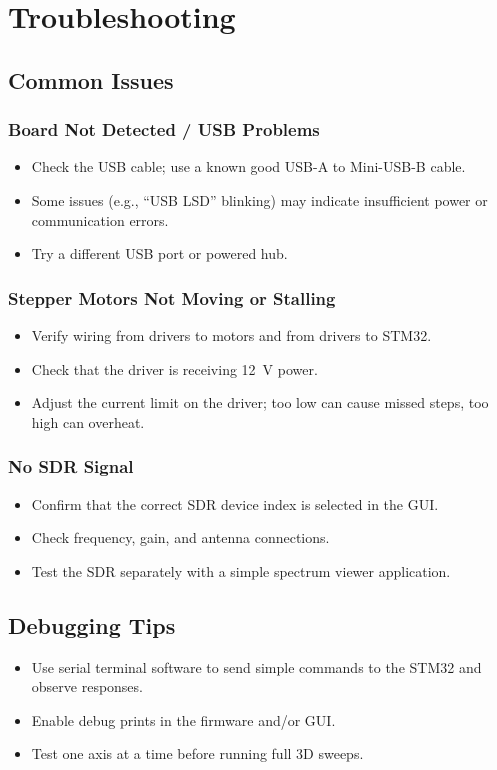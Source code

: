 \chapter{Troubleshooting}

\section{Common Issues}

\subsection{Board Not Detected / USB Problems}

\begin{itemize}
  \item Check the USB cable; use a known good USB-A to Mini-USB-B cable.
  \item Some issues (e.g., ``USB LSD'' blinking) may indicate insufficient power or communication errors.
  \item Try a different USB port or powered hub.
\end{itemize}

\subsection{Stepper Motors Not Moving or Stalling}

\begin{itemize}
  \item Verify wiring from drivers to motors and from drivers to STM32.
  \item Check that the driver is receiving 12~V power.
  \item Adjust the current limit on the driver; too low can cause missed steps, too high can overheat.
\end{itemize}

\subsection{No SDR Signal}

\begin{itemize}
  \item Confirm that the correct SDR device index is selected in the GUI.
  \item Check frequency, gain, and antenna connections.
  \item Test the SDR separately with a simple spectrum viewer application.
\end{itemize}

\section{Debugging Tips}

\begin{itemize}
  \item Use serial terminal software to send simple commands to the STM32 and observe responses.
  \item Enable debug prints in the firmware and/or GUI.
  \item Test one axis at a time before running full 3D sweeps.
\end{itemize}
